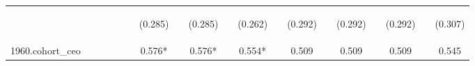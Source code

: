 \begin{center}
\begin{tabular}{lcccccccccccccccccc}
\vspace{4pt} & \begin{footnotesize}\end{footnotesize} & \begin{footnotesize}\end{footnotesize} & \begin{footnotesize}\end{footnotesize} & \begin{footnotesize}\end{footnotesize} & \begin{footnotesize}\end{footnotesize} & \begin{footnotesize}(0.285)\end{footnotesize} & \begin{footnotesize}\end{footnotesize} & \begin{footnotesize}(0.285)\end{footnotesize} & \begin{footnotesize}\end{footnotesize} & \begin{footnotesize}(0.262)\end{footnotesize} & \begin{footnotesize}\end{footnotesize} & \begin{footnotesize}(0.292)\end{footnotesize} & \begin{footnotesize}\end{footnotesize} & \begin{footnotesize}(0.292)\end{footnotesize} & \begin{footnotesize}\end{footnotesize} & \begin{footnotesize}(0.292)\end{footnotesize} & \begin{footnotesize}\end{footnotesize} & \begin{footnotesize}(0.307)\end{footnotesize} \\
1960.cohort\_ceo &  &  &  &  &  & 0.576* &  & 0.576* &  & 0.554* &  & 0.509 &  & 0.509 &  & 0.509 &  & 0.545 \\

\end{tabular}
\end{center}
